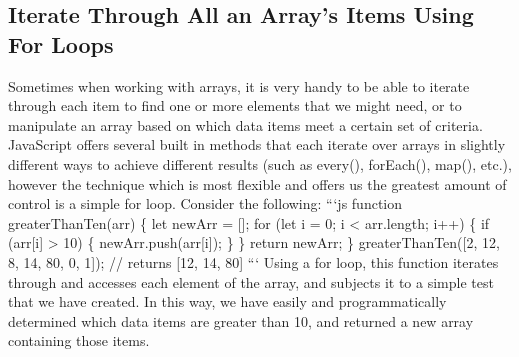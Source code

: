 \documentclass{article}%
\begin{document}
\subsection{Iterate Through All an Array's Items Using For Loops}%
\label{subsec:IterateThroughAllanArraysItemsUsingForLoops}%
Sometimes when working with arrays, it is very handy to be able to iterate through each item to find one or more elements that we might need, or to manipulate an array based on which data items meet a certain set of criteria. JavaScript offers several built in methods that each iterate over arrays in slightly different ways to achieve different results (such as every(), forEach(), map(), etc.), however the technique which is most flexible and offers us the greatest amount of control is a simple for loop.\newline%
Consider the following:\newline%
```js\newline%
function greaterThanTen(arr) \{\newline%
  let newArr = {[}{]};\newline%
  for (let i = 0; i < arr.length; i++) \{\newline%
    if (arr{[}i{]} > 10) \{\newline%
      newArr.push(arr{[}i{]});\newline%
    \}\newline%
  \}\newline%
  return newArr;\newline%
\}\newline%
greaterThanTen({[}2, 12, 8, 14, 80, 0, 1{]});\newline%
// returns {[}12, 14, 80{]}\newline%
```\newline%
Using a for loop, this function iterates through and accesses each element of the array, and subjects it to a simple test that we have created. In this way, we have easily and programmatically determined which data items are greater than 10, and returned a new array containing those items.\newline%

%
\end{document}
